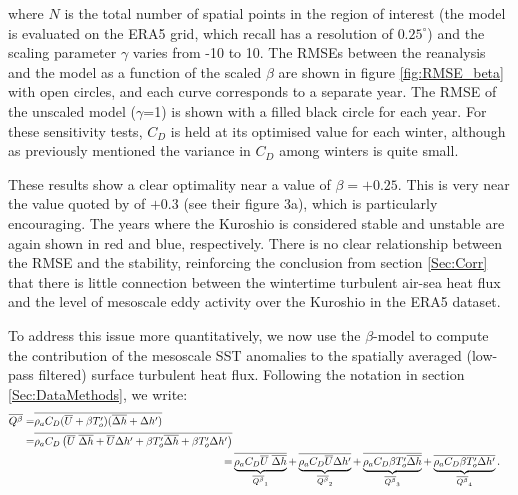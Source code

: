 where $N$ is the total number of spatial points in the region of interest (the model is evaluated on the ERA5 grid, which recall has a resolution of $0.25^{\circ}$) and the scaling parameter $\gamma$ varies from -10 to 10. The RMSEs between the reanalysis and the model as a function of the scaled $\beta$ are shown in figure \ref{fig:RMSE_beta} with open circles, and each curve corresponds to a separate year. The RMSE of the unscaled model ($\gamma$=1) is shown with a filled black circle for each year. For these sensitivity tests, $C_D$ is held at its optimised value for each winter, although as previously mentioned the variance in $C_D$ among winters is quite small.\par 
These results show a clear optimality near a value of $\beta = +0.25$. This is very near the value quoted by \citet{ONeill2010} of $+0.3$ (see their figure 3a), which is particularly encouraging. The years where the Kuroshio is considered stable and unstable are again shown in red and blue, respectively. There is no clear relationship between the RMSE and the stability, reinforcing the conclusion from section \ref{Sec:Corr} that there is little connection between the wintertime turbulent air-sea heat flux and the level of mesoscale eddy activity over the Kuroshio in the ERA5 dataset. \par 


To address this issue more quantitatively, we now use the $\beta$-model to compute the contribution of the mesoscale SST anomalies to the spatially averaged (low-pass filtered) surface turbulent heat flux. Following the notation in section \ref{Sec:DataMethods}, we write:
\begin{align}
\nonumber\begin{split}
     \overline{Q^\beta}  =& \overline{\rho_a C_D (\overline{U} + \beta T_o')(\overline{\Delta h} + \Delta h')}\\
     =&\overline{\rho_a C_D \left( \overline{U}\hspace*{1mm} \overline{\Delta h} +  \overline{U}\Delta h'+\beta T_o'\overline{\Delta h}+\beta T_o'\Delta h'\right)}
\end{split}\\
  =&\underbrace{\overline{\rho_a C_D \overline{U}\hspace*{1mm} \overline{\Delta h}}}_{\overline{Q^\beta}_1} +\underbrace{\overline{\rho_a C_D \overline{U}\Delta h'}}_{\overline{Q^\beta}_2}+\underbrace{\overline{\rho_a C_D\beta T_o'\overline{\Delta h}}}_{\overline{Q^\beta}_3}+\underbrace{\overline{\rho_a C_D\beta T_o'\Delta h'}}_{\overline{Q^\beta}_4}\label{eq:expand_beta_ABC}.
\end{align}



